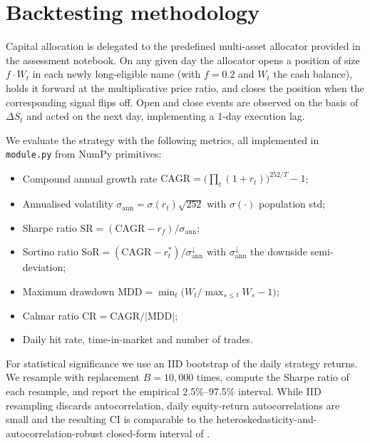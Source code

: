 \documentclass[11pt,a4paper]{article}
\begin{document}
\section{Backtesting methodology}

Capital allocation is delegated to the predefined multi-asset allocator
provided in the assessment notebook. On any given day the allocator opens a
position of size $f \cdot W_t$ in each newly long-eligible name (with
$f = 0.2$ and $W_t$ the cash balance), holds it forward at the multiplicative
price ratio, and closes the position when the corresponding signal flips off.
Open and close events are observed on the basis of $\Delta S_t$ and acted on
the next day, implementing a 1-day execution lag.

We evaluate the strategy with the following metrics, all implemented in
\texttt{module.py} from NumPy primitives:
\begin{itemize}[nosep]
  \item Compound annual growth rate
        $\mathrm{CAGR} = \bigl(\prod_t (1 + r_t)\bigr)^{252/T} - 1$;
  \item Annualised volatility
        $\sigma_{\mathrm{ann}} = \sigma(r_t)\sqrt{252}$ with $\sigma(\cdot)$ population std;
  \item Sharpe ratio
        $\mathrm{SR} = (\mathrm{CAGR} - r_f) / \sigma_{\mathrm{ann}}$;
  \item Sortino ratio
        $\mathrm{SoR} = (\mathrm{CAGR} - r_t^*) / \sigma_{\mathrm{ann}}^{\downarrow}$
        with $\sigma_{\mathrm{ann}}^{\downarrow}$ the downside semi-deviation;
  \item Maximum drawdown
        $\mathrm{MDD} = \min_t \bigl(W_t / \max_{s \le t} W_s - 1\bigr)$;
  \item Calmar ratio $\mathrm{CR} = \mathrm{CAGR} / |\mathrm{MDD}|$;
  \item Daily hit rate, time-in-market and number of trades.
\end{itemize}

For statistical significance we use an IID bootstrap of the daily strategy
returns. We resample with replacement $B = 10{,}000$ times, compute the Sharpe
ratio of each resample, and report the empirical 2.5\%--97.5\% interval.
While IID resampling discards autocorrelation, daily equity-return
autocorrelations are small and the resulting CI is comparable to the
heteroskedasticity-and-autocorrelation-robust closed-form interval of
\citet{Lo2002}.
\end{document}

